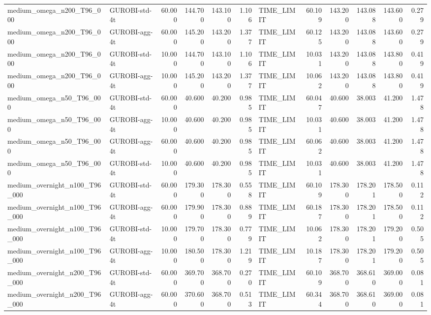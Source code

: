 \begin{table}[htbp]
\begin{tabular}{llrrrrlrrrrr}
medium\_omega\_n200\_T96\_000 & GUROBI-std-4t & 60.000 & 144.700 & 143.100 & 1.106 & TIME\_LIMIT & 60.109 & 143.200 & 143.088 & 143.600 & 0.279 \\
medium\_omega\_n200\_T96\_000 & GUROBI-agg-4t & 60.000 & 145.200 & 143.200 & 1.377 & TIME\_LIMIT & 60.125 & 143.200 & 143.088 & 143.600 & 0.279 \\
medium\_omega\_n200\_T96\_000 & GUROBI-std-4t & 10.000 & 144.700 & 143.100 & 1.106 & TIME\_LIMIT & 10.031 & 143.200 & 143.088 & 143.800 & 0.419 \\
medium\_omega\_n200\_T96\_000 & GUROBI-agg-4t & 10.000 & 145.200 & 143.200 & 1.377 & TIME\_LIMIT & 10.062 & 143.200 & 143.088 & 143.800 & 0.419 \\
medium\_omega\_n50\_T96\_000 & GUROBI-std-4t & 60.000 & 40.600 & 40.200 & 0.985 & TIME\_LIMIT & 60.047 & 40.600 & 38.003 & 41.200 & 1.478 \\
medium\_omega\_n50\_T96\_000 & GUROBI-agg-4t & 10.000 & 40.600 & 40.200 & 0.985 & TIME\_LIMIT & 10.031 & 40.600 & 38.003 & 41.200 & 1.478 \\
medium\_omega\_n50\_T96\_000 & GUROBI-agg-4t & 60.000 & 40.600 & 40.200 & 0.985 & TIME\_LIMIT & 60.062 & 40.600 & 38.003 & 41.200 & 1.478 \\
medium\_omega\_n50\_T96\_000 & GUROBI-std-4t & 10.000 & 40.600 & 40.200 & 0.985 & TIME\_LIMIT & 10.031 & 40.600 & 38.003 & 41.200 & 1.478 \\
medium\_overnight\_n100\_T96\_000 & GUROBI-std-4t & 60.000 & 179.300 & 178.300 & 0.558 & TIME\_LIMIT & 60.109 & 178.300 & 178.201 & 178.500 & 0.112 \\
medium\_overnight\_n100\_T96\_000 & GUROBI-agg-4t & 60.000 & 179.900 & 178.300 & 0.889 & TIME\_LIMIT & 60.187 & 178.300 & 178.201 & 178.500 & 0.112 \\
medium\_overnight\_n100\_T96\_000 & GUROBI-std-4t & 10.000 & 179.700 & 178.300 & 0.779 & TIME\_LIMIT & 10.062 & 178.300 & 178.201 & 179.200 & 0.505 \\
medium\_overnight\_n100\_T96\_000 & GUROBI-agg-4t & 10.000 & 180.500 & 178.300 & 1.219 & TIME\_LIMIT & 10.187 & 178.300 & 178.201 & 179.200 & 0.505 \\
medium\_overnight\_n200\_T96\_000 & GUROBI-std-4t & 60.000 & 369.700 & 368.700 & 0.270 & TIME\_LIMIT & 60.109 & 368.700 & 368.610 & 369.000 & 0.081 \\
medium\_overnight\_n200\_T96\_000 & GUROBI-agg-4t & 60.000 & 370.600 & 368.700 & 0.513 & TIME\_LIMIT & 60.344 & 368.700 & 368.610 & 369.000 & 0.081 \\

\end{tabular}
\end{table}
